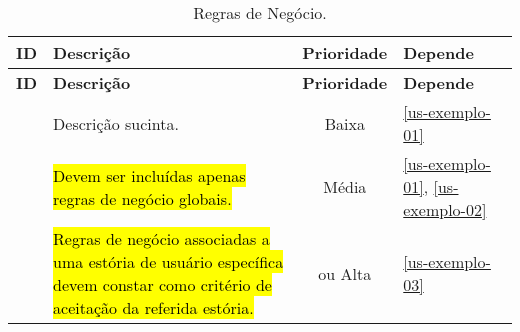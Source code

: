\begin{landscape}
\begin{longtable}{|c|p{18cm}|c|p{2.2cm}|}
	\caption{Regras de Negócio.}
	\label{tbl-requisitos-rns} \\\hline 
	
	\rowcolor{lightgray}
	\textbf{ID} & \textbf{Descrição} & \textbf{Prioridade} & \textbf{Depende} \\\hline	
	\endfirsthead
	\hline
	\rowcolor{lightgray}
	\textbf{ID} & \textbf{Descrição} & \textbf{Prioridade} & \textbf{Depende} \\\hline	
	\endhead
	
	\RN\label{rn-exemplo-01} & Descrição sucinta. & Baixa & \ref{us-exemplo-01} \\\hline

	\RN\label{rn-exemplo-02} & \hl{Devem ser incluídas apenas regras de negócio globais.} & Média & \ref{us-exemplo-01}, \ref{us-exemplo-02} \\\hline

	\RN\label{rn-exemplo-03} & \hl{Regras de negócio associadas a uma estória de usuário específica devem constar como critério de aceitação da referida estória.} & ou Alta & \ref{us-exemplo-03} \\\hline
\end{longtable}

\end{landscape}

